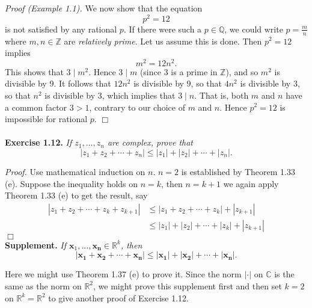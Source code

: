 \documentclass{article}
\begin{document}
\emph{Proof (Example 1.1).}
We now show that the equation
$$p^2 = 12$$
is not satisfied by any rational $p$.
If there were such a $p \in \mathbb{Q}$,
we could write $p = \frac{m}{n}$ where $m, n \in \mathbb{Z}$ are \emph{relatively prime}.
Let us assume this is done. Then $p^2 = 12$ implies
$$m^2 = 12 n^2.$$
This shows that $3 \mid m^2$. Hence $3 \mid m$ (since $3$ is a prime in $\mathbb{Z}$),
and so $m^2$ is divisible by $9$.
It follows that $12n^2$ is divisible by $9$,
so that $4n^2$ is divisible by $3$,
so that $n^2$ is divisible by $3$,
which implies that $3 \mid n$.
That is, both $m$ and $n$ have a common factor $3 > 1$,
contrary to our choice of $m$ and $n$.
Hence $p^2 = 12$ is impossible for rational $p$.
$\Box$ \\\\



\textbf{Exercise 1.12.}
\emph{If $z_1, ..., z_n$ are complex, prove that
$$|z_1 + z_2 + \cdots + z_n| \leq |z_1| + |z_2| + \cdots + |z_n|.$$}

\emph{Proof.}
Use mathematical induction on $n$. $n = 2$ is established by Theorem 1.33 (e).
Suppose the inequality holds on $n = k$, then $n = k + 1$ we again apply Theorem 1.33 (e)
to get the result, say
\begin{align*}
|z_1 + z_2 + \cdots + z_k + z_{k+1}|
&\leq |z_1 + z_2 + \cdots + z_k| + |z_{k+1}| \\
&\leq |z_1| + |z_2| + \cdots + |z_k| + |z_{k+1}|
\end{align*}
$\Box$ \\

\textbf{Supplement.}
\emph{If $\mathbf{x}_1, ..., \mathbf{x_n} \in \mathbb{R}^k$, then
$$|\mathbf{x_1} + \mathbf{x_2} + \cdots + \mathbf{x_n}|
\leq |\mathbf{x_1}| + |\mathbf{x_2}| + \cdots + |\mathbf{x_n}|.$$}

Here we might use Theorem 1.37 (e) to prove it.
Since the norm $|\cdot|$ on $\mathbb{C}$ is the same as the norm on $\mathbb{R}^2$,
we might prove this supplement first
and then set $k = 2$ on $\mathbb{R}^k = \mathbb{R}^2$ to give another proof of Exercise 1.12.
\end{document}
